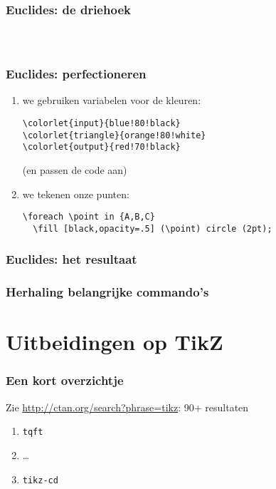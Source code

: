 \documentclass[]{beamer}
\begin{document}
\begin{frame}
  \frametitle{Euclides: de driehoek}

  \begin{columns}
    \begin{column}{.67\textwidth}
      \inputminted[fontsize = \scriptsize]{latex}{tikz/triangle/4a.tikz}
    \end{column}
    \begin{column}{.33\textwidth}
      
    \end{column}
  \end{columns}
\end{frame}

\begin{frame}[fragile]
  \frametitle{Euclides: perfectioneren}

  \begin{enumerate}
    \item we gebruiken variabelen voor de kleuren:
      \begin{verbatim}
\colorlet{input}{blue!80!black}
\colorlet{triangle}{orange!80!white}
\colorlet{output}{red!70!black}
      \end{verbatim}
      (en passen de code aan)
    \item\pause we tekenen onze punten:
      \begin{verbatim}
\foreach \point in {A,B,C}
  \fill [black,opacity=.5] (\point) circle (2pt);
      \end{verbatim}
  \end{enumerate}
\end{frame}

\begin{frame}
  \frametitle{Euclides: het resultaat}

  \centering
  
\end{frame}

\begin{frame}
  \frametitle{Herhaling belangrijke commando's}
\end{frame}

\section{Uitbeidingen op TikZ}

\begin{frame}
  \frametitle{Een kort overzichtje}

  Zie \url{http://ctan.org/search?phrase=tikz}: 90+ resultaten

  \begin{enumerate}
    \item \texttt{tqft}
    \item \ldots
    \item \texttt{tikz-cd}
  \end{enumerate}
\end{frame}
\end{document}
